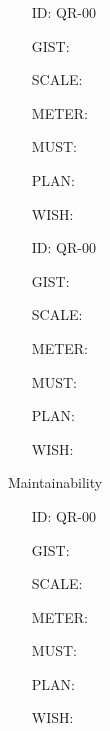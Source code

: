         \begin{itemize}
          \setlength{\itemindent}{.5in}
          \itemsep .15em
          \item[ID:] QR-00
          \item[GIST:]
          \item[SCALE:]
          \item[METER:]
          \item[MUST:]
          \item[PLAN:]
          \item[WISH:]
        \end{itemize}

        \begin{itemize}
          \setlength{\itemindent}{.5in}
          \itemsep .15em
          \item[ID:] QR-00
          \item[GIST:]
          \item[SCALE:]
          \item[METER:]
          \item[MUST:]
          \item[PLAN:]
          \item[WISH:]
        \end{itemize}

        Maintainability

        \begin{itemize}
          \setlength{\itemindent}{.5in}
          \itemsep .15em
          \item[ID:] QR-00
          \item[GIST:]
          \item[SCALE:]
          \item[METER:]
          \item[MUST:]
          \item[PLAN:]
          \item[WISH:]
        \end{itemize}




